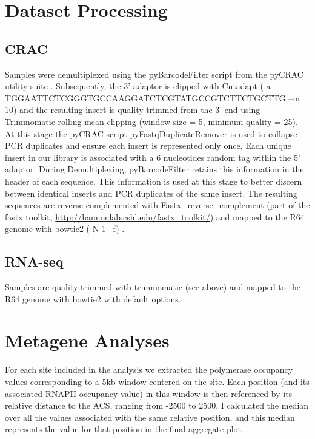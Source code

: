 \singlespacing
\section*{Dataset Processing}
\subsection*{CRAC}
\doublespacing

Samples were demultiplexed using the pyBarcodeFilter script from the pyCRAC utility suite \cite{webb:2014:parclip}. 
Subsequently, the 3’ adaptor is clipped with Cutadapt \cite{martin:2011:cutadapt} (-a TGGAATTCTCGGGTGCCAAGGATCTCGTATGCCGTCTTCTGCTTG –m 10) and the resulting insert is quality trimmed from the 3’ end using Trimmomatic rolling mean clipping \cite{bolger:2014:trimmomatic} (window size = 5, minimum quality = 25). 
At this stage the pyCRAC script pyFastqDuplicateRemover is used to collapse PCR duplicates and ensure each insert is represented only once. 
Each unique insert in our library is associated with a 6  nucleotides random tag within the 5’ adaptor. 
During Demultiplexing, pyBarcodeFilter retains this information in the header of each sequence. 
This information is used at this stage to better discern between identical inserts and PCR duplicates of the same insert. 
The resulting sequences are reverse complemented with Fastx\_reverse\_complement (part of the fastx toolkit, \url{http://hannonlab.cshl.edu/fastx_toolkit/}) and mapped to the R64 genome \cite{cherry:2012:saccharomyces} with bowtie2 (-N 1 –f) \cite{langmead:2012:fast}.

\subsection*{RNA-seq}

Samples are quality trimmed with trimmomatic (see above) and mapped to the R64 genome with bowtie2 with default options.

\section*{Metagene Analyses}

For each site included in the analysis we extracted the polymerase occupancy values corresponding to a 5kb window centered on the site. Each position (and its associated RNAPII occupancy value) in this window is then referenced by its relative distance to the ACS, ranging from -2500 to 2500. I calculated the median over all the values associated with the same relative position, and this median represents the value for that position in the final aggregate plot.

